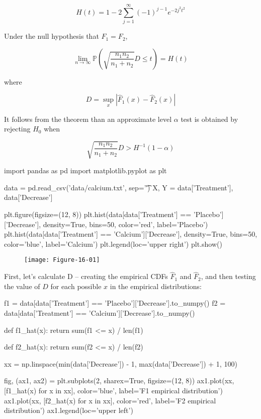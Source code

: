 {\[ H(t) = 1 - 2 \sum_{j=1}^\infty (-1)^{j-1} e^{-2j^2t^2} \]

Under the null hypothesis that \(F_1 = F_2\),

\[ \lim_{n \rightarrow \infty} \mathbb{P} \left( \sqrt{\frac{n_1 n_2}{n_1 + n_2}} D \leq t \right) = H(t) \]

where

\[ D = \sup_x | \hat{F}_1(x) - \hat{F}_2(x) |\]

It follows from the theorem than an approximate level \(\alpha\) test is
obtained by rejecting \(H_0\) when

\[ \sqrt{\frac{n_1 n_2}{n_1 + n_2}} D > H^{-1}(1 - \alpha) \]

\begin{python}
import pandas as pd
import matplotlib.pyplot as plt

data = pd.read_csv('data/calcium.txt', sep='\t')
X, Y = data['Treatment'], data['Decrease']
\end{python}

\begin{python}
plt.figure(figsize=(12, 8))
plt.hist(data[data['Treatment'] == 'Placebo']['Decrease'], 
         density=True, bins=50, color='red', label='Placebo')
plt.hist(data[data['Treatment'] == 'Calcium']['Decrease'], 
         density=True, bins=50, color='blue', label='Calcium')
plt.legend(loc='upper right')
plt.show()
\end{python}

\begin{figure}[H]
\texttt{[image: Figure-16-01]}
\end{figure}

First, let's calculate D -- creating the empirical CDFs \(\hat{F}_1\)
and \(\hat{F}_2\), and then testing the value of \(D\) for each possible
\(x\) in the empirical distributions:

\begin{python}
f1 = data[data['Treatment'] == 'Placebo']['Decrease'].to_numpy()
f2 = data[data['Treatment'] == 'Calcium']['Decrease'].to_numpy()

def f1_hat(x):
    return sum(f1 <= x) / len(f1)

def f2_hat(x):
    return sum(f2 <= x) / len(f2)

xx = np.linspace(min(data['Decrease']) - 1, max(data['Decrease']) + 1, 100)

fig, (ax1, ax2) = plt.subplots(2, sharex=True, figsize=(12, 8))
ax1.plot(xx, [f1_hat(x) for x in xx], color='blue', label='F1 empirical distribution')
ax1.plot(xx, [f2_hat(x) for x in xx], color='red', label='F2 empirical distribution')
ax1.legend(loc='upper left')


\end{python}}

